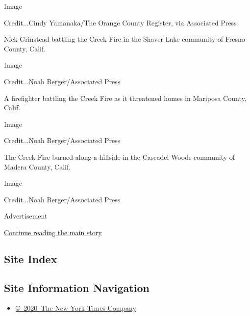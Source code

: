 Image

Credit...Cindy Yamanaka/The Orange County Register, via Associated Press

Nick Grinstead battling the Creek Fire in the Shaver Lake community of
Fresno County, Calif.

Image

Credit...Noah Berger/Associated Press

A firefighter battling the Creek Fire as it threatened homes in Mariposa
County, Calif.

Image

Credit...Noah Berger/Associated Press

The Creek Fire burned along a hillside in the Cascadel Woods community
of Madera County, Calif.

Image

Credit...Noah Berger/Associated Press

Advertisement

\protect\hyperlink{after-bottom}{Continue reading the main story}

\hypertarget{site-index}{%
\subsection{Site Index}\label{site-index}}

\hypertarget{site-information-navigation}{%
\subsection{Site Information
Navigation}\label{site-information-navigation}}

\begin{itemize}
\tightlist
\item
  \href{https://help.nytimes3xbfgragh.onion/hc/en-us/articles/115014792127-Copyright-notice}{©~2020~The
  New York Times Company}
\end{itemize}

